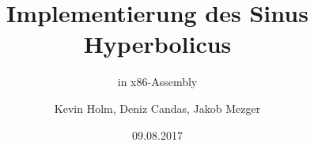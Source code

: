% 

\documentclass[mathserif]{beamer}

\usepackage[ngerman]{babel}
\usepackage[utf8]{inputenc}
\usepackage{listings}
\usepackage{tabularx}
\usepackage{graphicx}
\title{Implementierung des Sinus Hyperbolicus}
\subtitle{in x86-Assembly}
\author
{Kevin Holm, Deniz Candas, Jakob Mezger}
\date{09.08.2017}
\DeclareMathOperator{\term}{term}
[x86masm]{Assembler} %
{morekeywords={CDQE,CQO,CMPSQ,CMPXCHG16B,JRCXZ,LODSQ,MOVSXD, %
		POPFQ,PUSHFQ,SCASQ,STOSQ,IRETQ,RDTSCP,SWAPGS, %
		rax,rdx,rcx,rbx,rsi,rdi,rsp,rbp, %
		r8,r8d,r8w,r8b,r9,r9d,r9w,r9b, %
		r10,r10d,r10w,r10b,r11,r11d,r11w,r11b, %
		r12,r12d,r12w,r12b,r13,r13d,r13w,r13b, %
		r14,r14d,r14w,r14b,r15,r15d,r15w,r15b,fistp}} %



